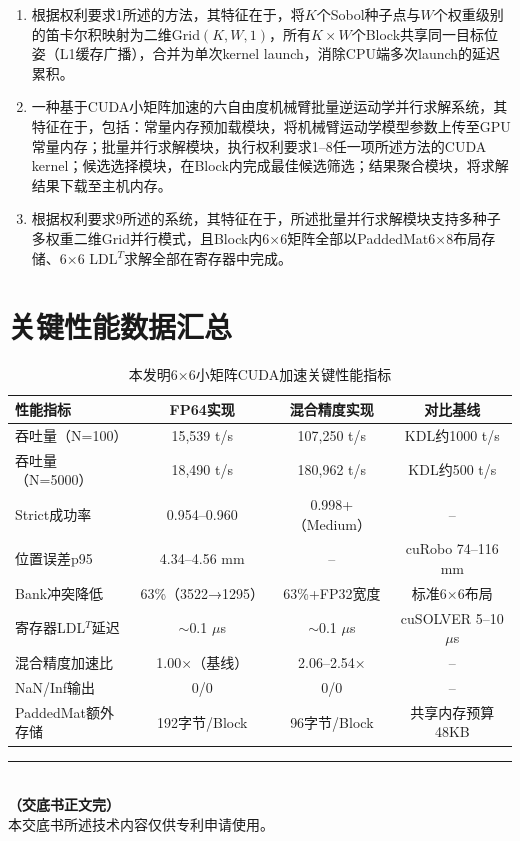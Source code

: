\documentclass[a4paper,12pt]{ctexart}
\begin{document}
\begin{enumerate}[label=\textbf{权利要求\arabic*：},leftmargin=*]
    \item 根据权利要求1所述的方法，其特征在于，将$K$个Sobol种子点与$W$个权重级别的笛卡尔积映射为二维Grid$(K,W,1)$，所有$K\times W$个Block共享同一目标位姿（L1缓存广播），合并为单次kernel launch，消除CPU端多次launch的延迟累积。

    \item 一种基于CUDA小矩阵加速的六自由度机械臂批量逆运动学并行求解系统，其特征在于，包括：常量内存预加载模块，将机械臂运动学模型参数上传至GPU常量内存；批量并行求解模块，执行权利要求1--8任一项所述方法的CUDA kernel；候选选择模块，在Block内完成最佳候选筛选；结果聚合模块，将求解结果下载至主机内存。

    \item 根据权利要求9所述的系统，其特征在于，所述批量并行求解模块支持多种子多权重二维Grid并行模式，且Block内6×6矩阵全部以PaddedMat6×8布局存储、6×6 LDL$^T$求解全部在寄存器中完成。
\end{enumerate}

\section{关键性能数据汇总}

\begin{table}[H]
\centering
\caption{本发明6×6小矩阵CUDA加速关键性能指标}
\small
\begin{tabular}{lccc}
\toprule
\textbf{性能指标} & \textbf{FP64实现} & \textbf{混合精度实现} & \textbf{对比基线}\\
\midrule
吞吐量（N=100） & 15,539 t/s & 107,250 t/s & KDL约1000 t/s\\
吞吐量（N=5000） & 18,490 t/s & 180,962 t/s & KDL约500 t/s\\
Strict成功率 & 0.954--0.960 & 0.998+（Medium） & --\\
位置误差p95 & 4.34--4.56 mm & -- & cuRobo 74--116 mm\\
Bank冲突降低 & 63\%（3522→1295） & 63\%+FP32宽度 & 标准6×6布局\\
寄存器LDL$^T$延迟 & $\sim$0.1 $\mu$s & $\sim$0.1 $\mu$s & cuSOLVER 5--10 $\mu$s\\
混合精度加速比 & 1.00×（基线） & 2.06--2.54× & --\\
NaN/Inf输出 & 0/0 & 0/0 & --\\
PaddedMat额外存储 & 192字节/Block & 96字节/Block & 共享内存预算48KB\\
\bottomrule
\end{tabular}
\end{table}

\vspace{1cm}
\begin{center}
\rule{0.5\textwidth}{0.4pt}\\[0.3cm]
{\small\bfseries （交底书正文完）}\\[0.3cm]
{\small 本交底书所述技术内容仅供专利申请使用。}
\end{center}
\end{document}
